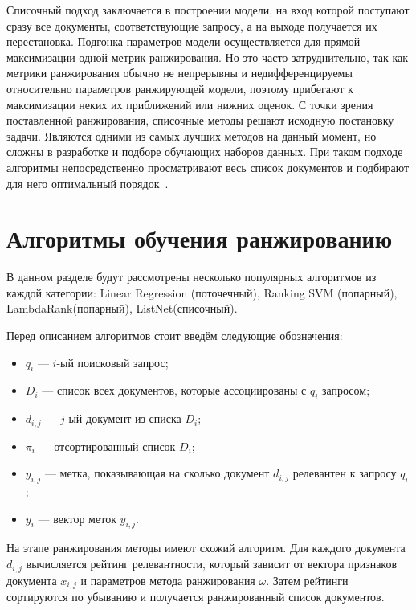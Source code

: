 Списочный подход заключается в построении модели, на вход которой поступают сразу все документы, соответствующие запросу, а на выходе получается их перестановка. Подгонка параметров модели осуществляется для прямой максимизации одной метрик ранжирования. Но это часто затруднительно, так как метрики ранжирования обычно не непрерывны и недифференцируемы относительно параметров ранжирующей модели, поэтому прибегают к максимизации неких их приближений или нижних оценок. С точки зрения поставленной ранжирования, списочные методы  решают исходную постановку задачи. Являются одними из самых лучших методов на данный момент, но  сложны в разработке и подборе обучающих наборов данных. При таком подходе алгоритмы непосредственно просматривают весь список документов и подбирают для него оптимальный порядок~\cite{LR_BOOK}.

\section{Алгоритмы обучения ранжированию}

В данном разделе будут рассмотрены несколько популярных алгоритмов из каждой категории: Linear Regression (поточечный), Ranking SVM (попарный), LambdaRank(попарный), ListNet(списочный). 

Перед описанием алгоритмов стоит введём следующие обозначения:
\begin{itemize}[label=---]
	\item $q_{i}$ --- $i$-ый поисковый запрос;
	\item $D_{i}$ --- список всех документов, которые ассоциированы с $q_{i}$ запросом;
	\item $d_{i,j}$ --- $j$-ый документ из списка $D_{i}$;
	\item $\pi_{i}$ --- отсортированный список $D_{i}$;
	\item $y_{i,j}$ --- метка, показывающая на сколько документ $d_{i,j}$ релевантен к запросу $q_{i}$;
	\item $y_{i}$ --- вектор меток $y_{i,j}$.
\end{itemize}

На этапе ранжирования методы имеют схожий алгоритм. Для каждого документа $d_{i,j}$ вычисляется рейтинг релевантности, который зависит от вектора признаков документа $x_{i,j}$ и параметров метода ранжирования $\omega$. Затем рейтинги сортируются по убыванию и получается ранжированный список документов.  

